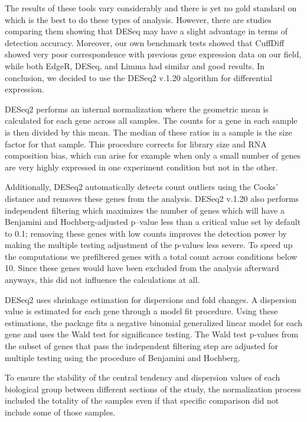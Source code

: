 The results of these tools vary considerably and there is yet no gold standard on which is the best to do these types of analysis. However, there are studies comparing them showing that DESeq may have a slight advantage in terms of detection accuracy. Moreover, our own benchmark tests showed that CuffDiff showed very poor correspondence with previous gene expression data on our field, while both EdgeR, DESeq, and Limma had similar and good results. In conclusion, we decided to use the DESeq2 v.1.20 algorithm for differential expression.\cite{Love2014}

DESeq2 performs an internal normalization where the geometric mean is calculated for each gene across all samples. The counts for a gene in each sample is then divided by this mean. The median of these ratios in a sample is the size factor for that sample. This procedure corrects for library size and RNA composition bias, which can arise for example when only a small number of genes are very highly expressed in one experiment condition but not in the other.

Additionally, DESeq2 automatically detects count outliers using the Cooks' distance and removes these genes from the analysis. DESeq2 v.1.20 also performs independent filtering which maximizes the number of genes which will have a Benjamini and Hochberg-adjusted p–value\cite{Benjamini1995} less than a critical value set by default to 0.1; removing these genes with low counts improves the detection power by making the multiple testing adjustment of the p-values less severe. To speed up the computations we prefiltered genes with a total count across conditions below 10. Since these genes would have been excluded from the analysis afterward anyways, this did not influence the calculations at all.

DESeq2 uses shrinkage estimation for dispersions and fold changes. A dispersion value is estimated for each gene through a model fit procedure. Using these estimations, the package fits a negative binomial generalized linear model for each gene and uses the Wald test for significance testing. The Wald test p-values from the subset of genes that pass the independent filtering step are adjusted for multiple testing using the procedure of Benjamini and Hochberg.\cite{Benjamini1995}

To ensure the stability of the central tendency and dispersion values of each biological group between different sections of the study, the normalization process included the totality of the samples even if that specific comparison did not include some of those samples.


